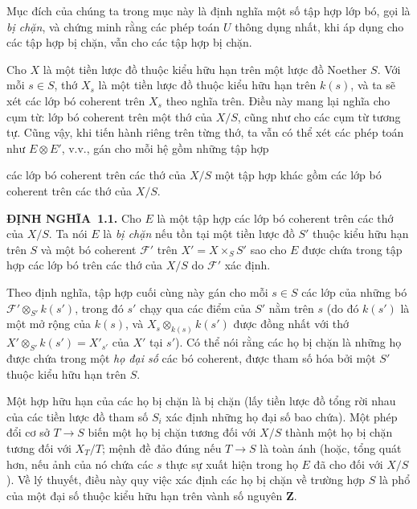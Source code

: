 \documentclass[11pt,twoside,openany]{book}
\numberwithin{equation}{section}
\newcommand{\src}[1]{%
  \phantomsection\hypertarget{src:\fgasourceid:#1}{}%
  \marginpar{\raggedleft\footnotesize\sffamily #1}%
}
\newcommand{\fgasourceid}{unset}
\newcommand{\result}[2]{\par\medskip\noindent\textbf{#1\if\relax\detokenize{#2}\relax\else\ #2\fi.}\quad}
\begin{document}
Mục đích của chúng ta trong mục này là định nghĩa một số tập hợp lớp bó, gọi là
\emph{bị chặn}, và chứng minh rằng các phép toán $U$ thông dụng nhất, khi áp
dụng cho các tập hợp bị chặn, vẫn cho các tập hợp bị chặn.

Cho $X$ là một tiền lược đồ thuộc kiểu hữu hạn trên một lược đồ Noether $S$.
Với mỗi $s\in S$, thớ $X_s$ là một tiền lược đồ thuộc kiểu hữu hạn trên
$k(s)$, và ta sẽ xét các lớp bó coherent trên $X_s$ theo nghĩa trên. Điều này
mang lại nghĩa cho cụm từ: lớp bó coherent trên một thớ của $X/S$, cũng như
cho các cụm từ tương tự. Cũng vậy, khi tiến hành riêng trên từng thớ, ta vẫn có
thể xét các phép toán như $E\otimes E'$, v.v., gán cho mỗi hệ gồm những tập hợp
\src{251}
các lớp bó coherent trên các thớ của $X/S$ một tập hợp khác gồm các lớp bó
coherent trên các thớ của $X/S$.

\result{ĐỊNH NGHĨA}{1.1} Cho $E$ là một tập hợp các lớp bó coherent trên các
thớ của $X/S$. Ta nói $E$ là \emph{bị chặn} nếu tồn tại một tiền lược đồ $S'$
thuộc kiểu hữu hạn trên $S$ và một bó coherent $\mathcal F'$ trên
$X'=X\times_S S'$ sao cho $E$ được chứa trong tập hợp các lớp bó trên các thớ
của $X/S$ do $\mathcal F'$ xác định.

Theo định nghĩa, tập hợp cuối cùng này gán cho mỗi $s\in S$ các lớp của những bó
$\mathcal F'\otimes_{S'}k(s')$, trong đó $s'$ chạy qua các điểm của $S'$ nằm
trên $s$ (do đó $k(s')$ là một mở rộng của $k(s)$, và
$X_s\otimes_{k(s)}k(s')$ được đồng nhất với thớ
$X'\otimes_{S'}k(s')=X'_{s'}$ của $X'$ tại $s'$). Có thể nói rằng các họ bị
chặn là những họ được chứa trong một \emph{họ đại số} các bó coherent, được
tham số hóa bởi một $S'$ thuộc kiểu hữu hạn trên $S$.

Một hợp hữu hạn của các họ bị chặn là bị chặn (lấy tiền lược đồ tổng rời nhau
của các tiền lược đồ tham số $S_i$ xác định những họ đại số bao chứa). Một phép
đổi cơ sở $T\longrightarrow S$ biến một họ bị chặn tương đối với $X/S$ thành
một họ bị chặn tương đối với $X_T/T$; mệnh đề đảo đúng nếu
$T\longrightarrow S$ là toàn ánh (hoặc, tổng quát hơn, nếu ảnh của nó chứa các
$s$ thực sự xuất hiện trong họ $E$ đã cho đối với $X/S$). Về lý thuyết, điều
này quy việc xác định các họ bị chặn về trường hợp $S$ là phổ của một đại số
thuộc kiểu hữu hạn trên vành số nguyên $\mathbf Z$.
\end{document}
